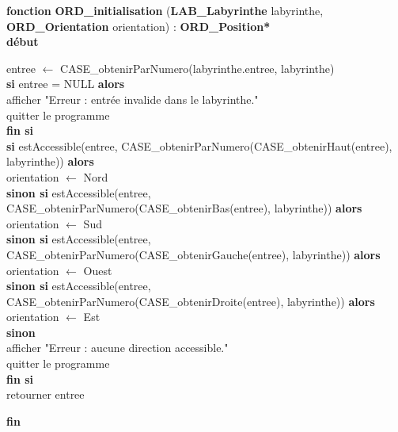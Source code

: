 \noindent\textbf{fonction} \textbf{ORD\_initialisation} (\textbf{LAB\_Labyrinthe} labyrinthe, \textbf{ORD\_Orientation} orientation) : \textbf{ORD\_Position*}\\
\textbf{début}
\begin{flushleft}
    \hspace*{1cm}entree $\gets$ CASE\_obtenirParNumero(labyrinthe.entree, labyrinthe)\\
    \hspace*{1cm}\textbf{si} entree = NULL \textbf{alors}\\
    \hspace*{2cm}afficher "Erreur : entrée invalide dans le labyrinthe."\\
    \hspace*{2cm}quitter le programme\\
    \hspace*{1cm}\textbf{fin si}\\
    \hspace*{1cm}\textbf{si} estAccessible(entree, CASE\_obtenirParNumero(CASE\_obtenirHaut(entree), labyrinthe)) \textbf{alors}\\
    \hspace*{2cm}orientation $\gets$ Nord\\
    \hspace*{1cm}\textbf{sinon si} estAccessible(entree, CASE\_obtenirParNumero(CASE\_obtenirBas(entree), labyrinthe)) \textbf{alors}\\
    \hspace*{2cm}orientation $\gets$ Sud\\
    \hspace*{1cm}\textbf{sinon si} estAccessible(entree, CASE\_obtenirParNumero(CASE\_obtenirGauche(entree), labyrinthe)) \textbf{alors}\\
    \hspace*{2cm}orientation $\gets$ Ouest\\
    \hspace*{1cm}\textbf{sinon si} estAccessible(entree, CASE\_obtenirParNumero(CASE\_obtenirDroite(entree), labyrinthe)) \textbf{alors}\\
    \hspace*{2cm}orientation $\gets$ Est\\
    \hspace*{1cm}\textbf{sinon}\\
    \hspace*{2cm}afficher "Erreur : aucune direction accessible."\\
    \hspace*{2cm}quitter le programme\\
    \hspace*{1cm}\textbf{fin si}\\
    \hspace*{1cm}retourner entree
\end{flushleft}
\textbf{fin}\\ 

